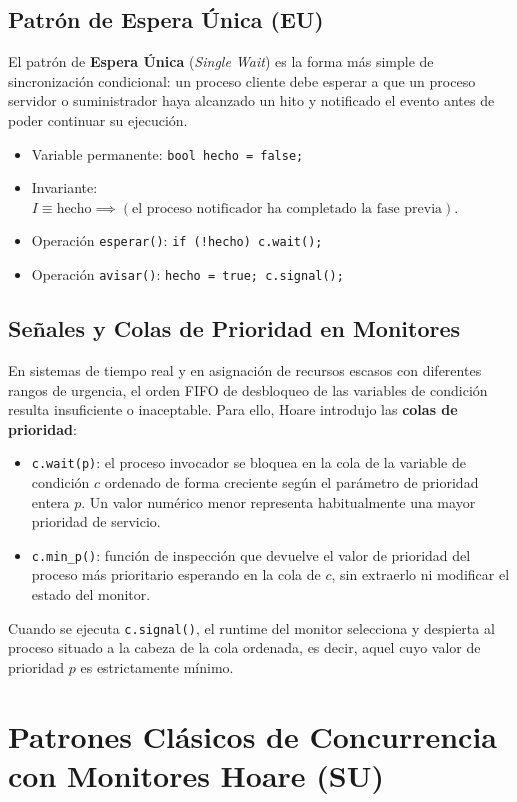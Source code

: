 \subsection{Patrón de Espera Única (EU)}
El patrón de \textbf{Espera Única} (\emph{Single Wait}) es la forma más simple de sincronización condicional: un proceso cliente debe esperar a que un proceso servidor o suministrador haya alcanzado un hito y notificado el evento antes de poder continuar su ejecución.
\begin{itemize}[leftmargin=*]
    \item Variable permanente: \texttt{bool hecho = false;}
    \item Invariante: $I \equiv \text{hecho} \implies (\text{el proceso notificador ha completado la fase previa})$.
    \item Operación \texttt{esperar()}: \texttt{if (!hecho) c.wait();}
    \item Operación \texttt{avisar()}: \texttt{hecho = true; c.signal();}
\end{itemize}

\subsection{Señales y Colas de Prioridad en Monitores}
En sistemas de tiempo real y en asignación de recursos escasos con diferentes rangos de urgencia, el orden FIFO de desbloqueo de las variables de condición resulta insuficiente o inaceptable. Para ello, Hoare introdujo las \textbf{colas de prioridad}:
\begin{itemize}[leftmargin=*]
    \item \texttt{c.wait(p)}: el proceso invocador se bloquea en la cola de la variable de condición $c$ ordenado de forma creciente según el parámetro de prioridad entera $p$. Un valor numérico menor representa habitualmente una mayor prioridad de servicio.
    \item \texttt{c.min\_p()}: función de inspección que devuelve el valor de prioridad del proceso más prioritario esperando en la cola de $c$, sin extraerlo ni modificar el estado del monitor.
\end{itemize}
Cuando se ejecuta \texttt{c.signal()}, el runtime del monitor selecciona y despierta al proceso situado a la cabeza de la cola ordenada, es decir, aquel cuyo valor de prioridad $p$ es estrictamente mínimo.

\section{Patrones Clásicos de Concurrencia con Monitores Hoare (SU)}

